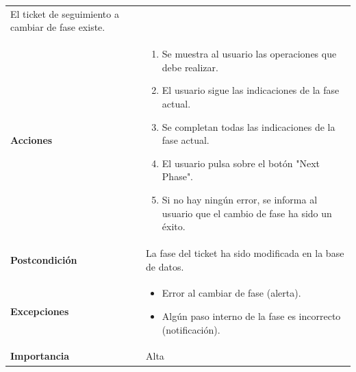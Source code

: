 \documentclass[
]{article}
\providecommand{\tightlist}{%
  \setlength{\itemsep}{0pt}\setlength{\parskip}{0pt}}
\begin{document}
\begin{longtable}[]{@{}ll@{}}
\begin{minipage}[t]{0.73\columnwidth}
El ticket de seguimiento a cambiar de fase existe.\strut
\end{minipage}\tabularnewline
\begin{minipage}[t]{0.21\columnwidth}\raggedright
\textbf{Acciones}\strut
\end{minipage} & \begin{minipage}[t]{0.73\columnwidth}\raggedright
\begin{enumerate}
\def\labelenumi{\arabic{enumi}.}
\tightlist
\item
  Se muestra al usuario las operaciones que debe realizar.
\item
  El usuario sigue las indicaciones de la fase actual.
\item
  Se completan todas las indicaciones de la fase actual.
\item
  El usuario pulsa sobre el botón "Next Phase".
\item
  Si no hay ningún error, se informa al usuario que el cambio de fase ha
  sido un éxito.
\end{enumerate}\strut
\end{minipage}\tabularnewline
\begin{minipage}[t]{0.21\columnwidth}\raggedright
\textbf{Postcondición}\strut
\end{minipage} & \begin{minipage}[t]{0.73\columnwidth}\raggedright
La fase del ticket ha sido modificada en la base de datos.\strut
\end{minipage}\tabularnewline
\begin{minipage}[t]{0.21\columnwidth}\raggedright
\textbf{Excepciones}\strut
\end{minipage} & \begin{minipage}[t]{0.73\columnwidth}\raggedright
\begin{itemize}
\tightlist
\item
  Error al cambiar de fase (alerta).
\item
  Algún paso interno de la fase es incorrecto (notificación).
\end{itemize}\strut
\end{minipage}\tabularnewline
\begin{minipage}[t]{0.21\columnwidth}\raggedright
\textbf{Importancia}\strut
\end{minipage} & \begin{minipage}[t]{0.73\columnwidth}\raggedright
Alta\strut
\end{minipage}\tabularnewline
\bottomrule
\end{longtable}
\end{document}
